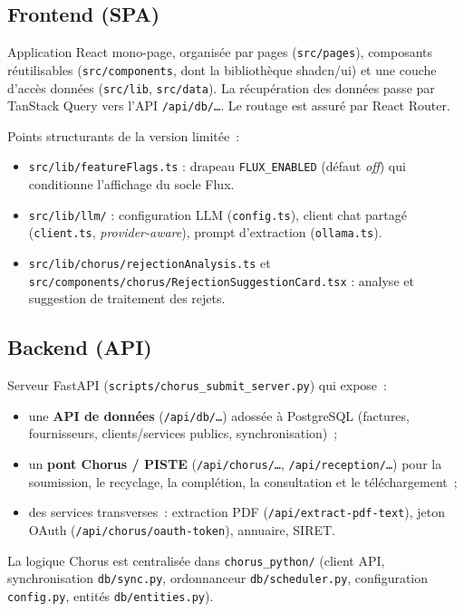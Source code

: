 \documentclass[11pt,a4paper]{article}
\newcommand{\code}[1]{\texttt{\small #1}}
\begin{document}
\subsection{Frontend (SPA)}
Application React mono-page, organisée par pages (\code{src/pages}), composants
réutilisables (\code{src/components}, dont la bibliothèque shadcn/ui) et une
couche d'accès données (\code{src/lib}, \code{src/data}). La récupération des
données passe par TanStack Query vers l'API \code{/api/db/\dots}. Le routage est
assuré par React Router.

Points structurants de la version limitée~:
\begin{itemize}[nosep]
  \item \code{src/lib/featureFlags.ts} : drapeau \code{FLUX\_ENABLED} (défaut
        \emph{off}) qui conditionne l'affichage du socle Flux.
  \item \code{src/lib/llm/} : configuration LLM (\code{config.ts}), client chat
        partagé (\code{client.ts}, \emph{provider-aware}), prompt d'extraction
        (\code{ollama.ts}).
  \item \code{src/lib/chorus/rejectionAnalysis.ts} et
        \code{src/components/chorus/RejectionSuggestionCard.tsx} : analyse et
        suggestion de traitement des rejets.
\end{itemize}

\subsection{Backend (API)}
Serveur FastAPI (\code{scripts/chorus\_submit\_server.py}) qui expose~:
\begin{itemize}[nosep]
  \item une \textbf{API de données} (\code{/api/db/\dots}) adossée à PostgreSQL
        (factures, fournisseurs, clients/services publics, synchronisation)~;
  \item un \textbf{pont Chorus / PISTE} (\code{/api/chorus/\dots},
        \code{/api/reception/\dots}) pour la soumission, le recyclage, la
        complétion, la consultation et le téléchargement~;
  \item des services transverses~: extraction PDF (\code{/api/extract-pdf-text}),
        jeton OAuth (\code{/api/chorus/oauth-token}), annuaire, SIRET.
\end{itemize}
La logique Chorus est centralisée dans \code{chorus\_python/} (client API,
synchronisation \code{db/sync.py}, ordonnanceur \code{db/scheduler.py},
configuration \code{config.py}, entités \code{db/entities.py}).
\end{document}
